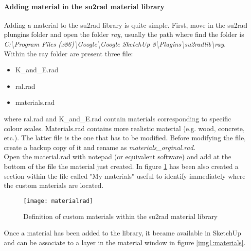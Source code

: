 \paragraph{Adding material in the su2rad material library}
Adding a material to the su2rad library is quite simple. First, move in the su2rad plungins folder and open the folder \textit{ray}, usually the path where find the folder is \textit{C:\textbackslash Program Files (x86)\textbackslash Google\textbackslash Google SketchUp 8\textbackslash Plugins\textbackslash su2radlib\textbackslash ray}.\\
Within the ray folder are present three file:
\begin{itemize}
\renewcommand{\labelitemi}{\tiny$\blacksquare$}
\item K\_and\_E.rad
\item  ral.rad
\item materials.rad
\end{itemize}
where ral.rad and K\_and\_E.rad contain materials corresponding to specific colour scales. Materials.rad contains more realistic material (e.g. wood, concrete, etc.). The latter file is the one that has to be modified. Before modifying the file, create a backup copy of it and rename as \textit{materials\_orginal.rad}.\\
Open the material.rad with notepad (or equivalent software) and add at the bottom of the file the material just created. In figure \ref{img1:materialrad} has been also created a section within the file called "My materials" useful to identify immediately where the custom materials are located.
\begin{figure}[h]
\centering
\texttt{[image: materialrad]}
\caption{\label{img1:materialrad} Definition of custom materials within the su2rad material library}
\end{figure}
Once a material has been added to the library, it became available in SketchUp and can be associate to a layer in the material window in figure \ref{img1:materials}.

